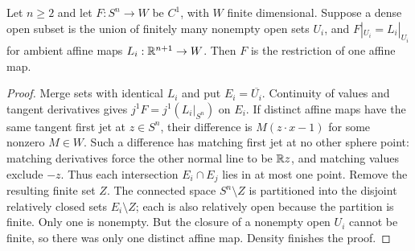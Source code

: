 \begin{lemma}
\label{lem:finite-affine-selection}
Let $n\geq2$ and let $F:S^n\to W$ be $C^1$, with $W$ finite dimensional.
Suppose a dense open subset is the union of finitely many nonempty open
sets $U_i$, and $F|_{U_i}=L_i|_{U_i}$ for ambient affine maps
$L_i:\mathbb R^{n+1}\to W$. Then $F$ is the restriction of one affine map.
\end{lemma}
\begin{proof}
Merge sets with identical $L_i$ and put $E_i=\overline{U_i}$. Continuity
of values and tangent derivatives gives $j^1F=j^1(L_i|_{S^n})$ on $E_i$.
If distinct affine maps have the same tangent first jet at $z\in S^n$,
their difference is $M(z\cdot x-1)$ for some nonzero $M\in W$.
Such a difference has matching first jet at no other sphere point:
matching derivatives force the other normal line to be $\mathbb R z$, and
matching values exclude $-z$. Thus each intersection $E_i\cap E_j$ lies
in at most one point. Remove the resulting finite set $Z$. The connected
space $S^n\setminus Z$ is partitioned into the disjoint relatively closed
sets $E_i\setminus Z$; each is also relatively open because the partition
is finite. Only one is nonempty. But the closure of a nonempty open $U_i$
cannot be finite, so there was only one distinct affine map. Density
finishes the proof.
\end{proof}

